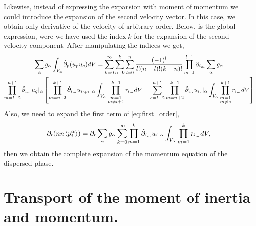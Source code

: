 {Likewise, instead of expressing the expansion with moment of momentum we could introduce the expansion of the second velocity vector.
In this case, we obtain only derivative of the velocity of arbitrary order.
Below, is the global expression, were we have used the index $k$ for the expansion of the second velocity component.
After manipulating the indices we get,
\begin{multline*}
    \sum_\alpha g_\alpha \int_{V_\alpha} \hat{\partial}_p(u_pu_q)  dV
    =
    \sum_{k=0}^\infty
    \sum_{n=0}^k
    \sum_{l=0}^n
    \frac{(-1)^l}{l!(n-l)!(k-n)!}
    \prod^{l+1}_{m=1}
    \partial_{i_m}
    \sum_{\alpha}
    g_{\alpha}\\
    \prod_{m=l+2}^{n+1} \hat{\partial}_{i_m}u_q|_\alpha
    \left[
    \prod_{m=n+2}^{k+1} \hat{\partial}_{i_m}  
    u_{i_{l+1}}|_\alpha
    \int_{V_\alpha}
        \prod_{\substack{m=1\\ m\neq l+1}}^{k+1} r_{i_m}
    dV
    -
    \sum_{e=l+2}^{n+1}
    \prod_{m=n+2}^{k+1} \hat{\partial}_{i_m}
    u_{i_e}|_\alpha
    \int_{V_\alpha}
        \prod_{\substack{m=1\\ m\neq e}}^{k+1} r_{i_m}
    dV
    \right]
\end{multline*}
Also, we need to expand the first term of \ref{eq:first_order},
\begin{equation*}
    \partial_t (nn \left<p^\alpha_i\right>)
    = \partial_t \sum_\alpha g_\alpha 
    \sum_{k=0}^\infty \prod_{m=1}^{k} \hat{\partial}_{i_m} u_i|_\alpha \int_{V_\alpha} \prod_{m=1}^{k} r_{i_m} dV, 
\end{equation*}
then we obtain the complete expansion of the momentum equation of the dispersed phase.  


\section{Transport of the moment of inertia and momentum.}

}
